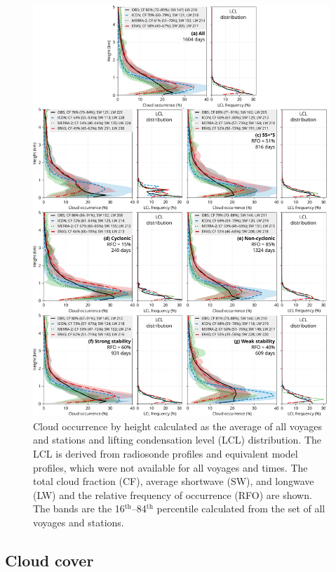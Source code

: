 \documentclass[draft]{agujournal2019}
\begin{document}
\begin{figure}[p!]
\centering
\includegraphics[width=\textwidth]{img/cl_agg.pdf}
\caption{
Cloud occurrence by height calculated as the average of all voyages and
stations and lifting condensation level (LCL) distribution. The LCL is derived
from radiosonde profiles and equivalent model profiles, which were not
available for all voyages and times. The total cloud fraction (CF), average
shortwave (SW), and longwave (LW) and the relative frequency of occurrence
(RFO) are shown. The bands are the 16$^\mathrm{th}$--84$^\mathrm{th}$
percentile calculated from the set of all voyages and stations.
}
\label{fig:cloud-occurrence}
\end{figure}

\subsection{Cloud cover}
\label{sec:cloud-cover}
\end{document}
